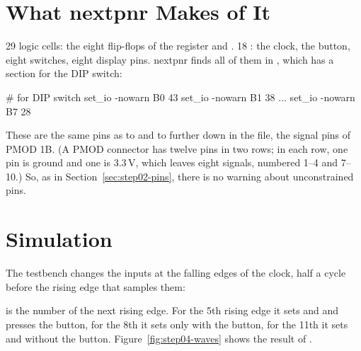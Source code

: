 \section{What nextpnr Makes of It}
\label{sec:step04-pnr}


29 logic cells: the eight flip-flops of the register and .
18 : the clock, the button, eight switches, eight display pins.
nextpnr finds all of them in , which has a section for
the DIP switch:
\begin{terminal}
# for DIP switch
set_io -nowarn B0         43
set_io -nowarn B1         38
...
set_io -nowarn B7         28
\end{terminal}
These are the same pins as  to  and  to 
further down in the file, the signal pins of PMOD 1B. (A PMOD connector has
twelve pins in two rows; in each row, one pin is ground and one is 3.3\,V,
which leaves eight signals, numbered 1--4 and 7--10.) So, as in
Section~\ref{sec:step02-pins}, there is no warning about unconstrained pins.

\section{Simulation}
\label{sec:step04-sim}

The testbench changes the inputs at the falling edges of the clock, half a
cycle before the rising edge that samples them:


 is the number of the next rising edge. For the 5th
rising edge it sets  and  and presses the button, for the 8th
it sets only  with the button, for the 11th it sets  and
 without the button. Figure~\ref{fig:step04-waves} shows the result of
.

